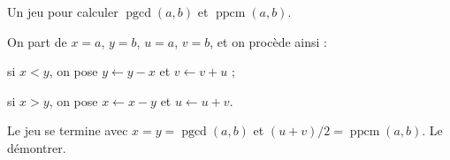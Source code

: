 Un jeu pour calculer $\operatorname{pgcd}(a, b)$ et $\operatorname{ppcm}(a, b)$.

On part de $x = a$, $y = b$, $u = a$, $v = b$, et on procède ainsi :

si $x < y$, on pose $y \leftarrow y - x$ et $v \leftarrow v + u$ ;

si $x > y$, on pose $x \leftarrow x - y$ et $u \leftarrow u + v$.

Le jeu se termine avec $x = y = \operatorname{pgcd}(a, b)$ et $(u + v)/2 = \operatorname{ppcm}(a, b)$. Le démontrer.
